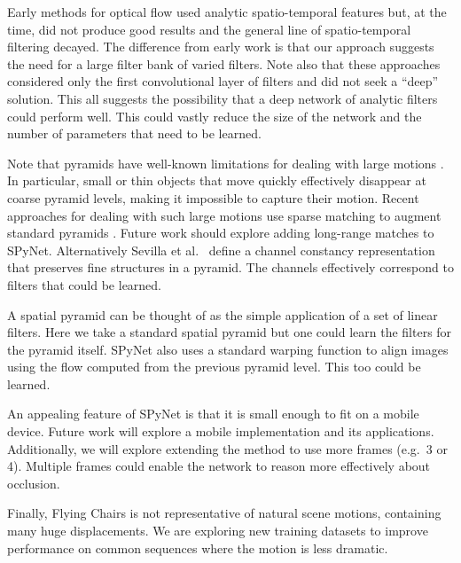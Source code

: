 \documentclass[10pt,twocolumn,letterpaper]{article}
\begin{document}
Early methods for optical flow used analytic spatio-temporal features but, at the time, did not produce good results and the general line of spatio-temporal filtering decayed.
The difference from early work is that our approach suggests the need for a large filter bank of varied filters.
Note also that these approaches considered only the first convolutional layer of filters and did not seek a ``deep'' solution. 
This all suggests the possibility that a deep network of analytic filters could perform well.  
This could vastly reduce the size of the network and the number of parameters that need to be learned.

Note that pyramids have well-known limitations for dealing with large motions \cite{brox2009large,Sevilla:ECCV:2014}.
In particular, small or thin objects that move quickly effectively disappear at coarse pyramid levels, making it impossible to capture their motion.
Recent approaches for dealing with such large motions use sparse matching to augment standard pyramids \cite{brox2009large,weinzaepfel2013deepflow}.
Future work should explore adding long-range matches to SPyNet.
Alternatively Sevilla et al.~\cite{Sevilla:ECCV:2014} define a channel constancy representation that preserves fine structures in a pyramid.
The channels effectively correspond to filters that could be learned.

A spatial pyramid can be thought of as the simple application of a set of linear filters.
Here we take a standard spatial pyramid but one could learn the filters for the pyramid itself.
SPyNet also uses a standard warping function to align images using the flow computed from the previous pyramid level. 
This too could be learned. 



An appealing feature of SPyNet is that it is small enough to fit on a mobile device.  
Future work will explore a mobile implementation and its applications.
Additionally, we will explore extending the method to use more frames (e.g.~3 or 4).  
Multiple frames could enable the network to reason more effectively about occlusion.

Finally, Flying Chairs is not representative of natural scene motions, containing many huge displacements.
We are exploring new training datasets to improve performance on common sequences where the motion is less dramatic.
\end{document}
